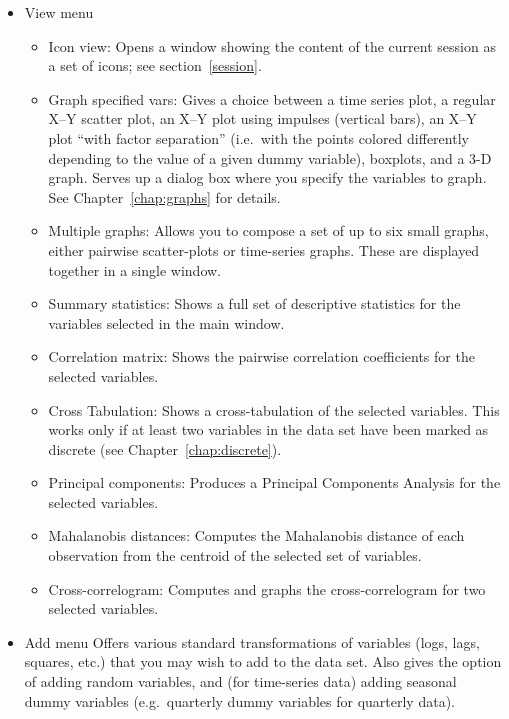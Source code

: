 \begin{itemize}
\item \textsf{View menu} 
  \begin{itemize}
  \item \textsf{Icon view}: Opens a window showing the content of
    the current session as a set of icons; see section~\ref{session}.
  \item \textsf{Graph specified vars}: Gives a choice between a time
    series plot, a regular X--Y scatter plot, an X--Y plot using
    impulses (vertical bars), an X--Y plot ``with factor separation''
    (i.e.\ with the points colored differently depending to the value
    of a given dummy variable), boxplots, and a 3-D graph. Serves up a
    dialog box where you specify the variables to graph. See
    Chapter~\ref{chap:graphs} for details.
  \item \textsf{Multiple graphs}: Allows you to compose a set of up to
    six small graphs, either pairwise scatter-plots or time-series
    graphs.  These are displayed together in a single window.
  \item \textsf{Summary statistics}: Shows a full set of
    descriptive statistics for the variables selected in the main
    window.
  \item \textsf{Correlation matrix}: Shows the pairwise correlation
    coefficients for the selected variables.
  \item \textsf{Cross Tabulation}: Shows a cross-tabulation of the
    selected variables.  This works only if at least two variables
    in the data set have been marked as discrete (see
    Chapter~\ref{chap:discrete}).  
  \item \textsf{Principal components}: Produces a Principal Components
    Analysis for the selected variables.
  \item \textsf{Mahalanobis distances}: Computes the Mahalanobis
    distance of each observation from the centroid of the selected set
    of variables.
  \item \textsf{Cross-correlogram}: Computes and graphs the
    cross-correlogram for two selected variables.
  \end{itemize}

\item \textsf{Add menu} Offers various standard transformations
  of variables (logs, lags, squares, etc.) that you may wish to add to
  the data set. Also gives the option of adding random variables, and
  (for time-series data) adding seasonal dummy variables (e.g.\
  quarterly dummy variables for quarterly data).


\end{itemize}
